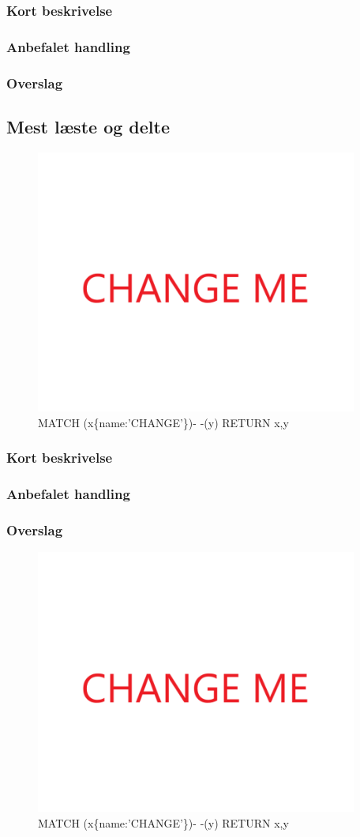 \documentclass{article}
\begin{document}
\subsubsection{Kort beskrivelse}
\subsubsection{Anbefalet handling}
\subsubsection{Overslag}
\subsection{Mest læste og delte}
\begin{figure}[h]
\includegraphics[width=300pt]{CHANGE.PNG}
\caption{MATCH (x\{name:'CHANGE'\})- -(y) RETURN x,y}
\end{figure}
\subsubsection{Kort beskrivelse}
\subsubsection{Anbefalet handling}
\subsubsection{Overslag}
\begin{figure}[h]
\includegraphics[width=300pt]{CHANGE.PNG}
\caption{MATCH (x\{name:'CHANGE'\})- -(y) RETURN x,y}
\end{figure}
\end{document}
